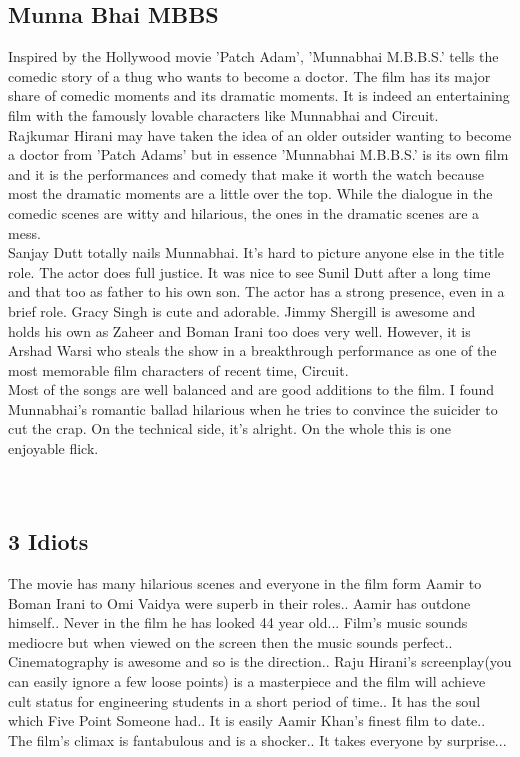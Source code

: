 \documentclass{article}
\begin{document}
\subsection{Munna Bhai MBBS}
Inspired by the Hollywood movie 'Patch Adam', 'Munnabhai M.B.B.S.' tells the comedic story of a thug who wants to become a doctor. The film has its major share of comedic moments and its dramatic moments. It is indeed an entertaining film with the famously lovable characters like Munnabhai and Circuit. 
\\
Rajkumar Hirani may have taken the idea of an older outsider wanting to become a doctor from 'Patch Adams' but in essence 'Munnabhai M.B.B.S.' is its own film and it is the performances and comedy that make it worth the watch because most the dramatic moments are a little over the top. While the dialogue in the comedic scenes are witty and hilarious, the ones in the dramatic scenes are a mess.
\\
Sanjay Dutt totally nails Munnabhai. It's hard to picture anyone else in the title role. The actor does full justice. It was nice to see Sunil Dutt after a long time and that too as father to his own son. The actor has a strong presence, even in a brief role. Gracy Singh is cute and adorable. Jimmy Shergill is awesome and holds his own as Zaheer and Boman Irani too does very well. However, it is Arshad Warsi who steals the show in a breakthrough performance as one of the most memorable film characters of recent time, Circuit.
\\
Most of the songs are well balanced and are good additions to the film. I found Munnabhai's romantic ballad hilarious when he tries to convince the suicider to cut the crap. On the technical side, it's alright. On the whole this is one enjoyable flick.
\\ \\ \\
\subsection{3 Idiots}
The movie has many hilarious scenes and everyone in the film form Aamir to Boman Irani to Omi Vaidya were superb in their roles.. Aamir has outdone himself.. Never in the film he has looked 44 year old... Film's music sounds mediocre but when viewed on the screen then the music sounds perfect.. Cinematography is awesome and so is the direction.. Raju Hirani's screenplay(you can easily ignore a few loose points) is a masterpiece and the film will achieve cult status for engineering students in a short period of time.. It has the soul which Five Point Someone had.. It is easily Aamir Khan's finest film to date.. The film's climax is fantabulous and is a shocker.. It takes everyone by surprise...
\end{document}

